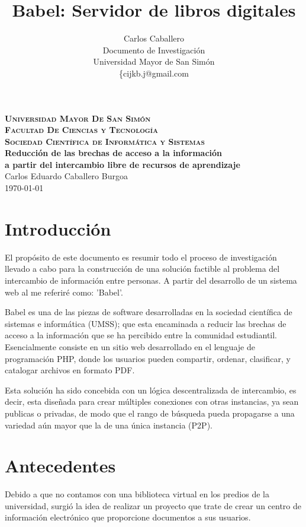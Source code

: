 \documentclass[letter,11pt,oneside,spanish]{article}
\title{\textbf{Babel: Servidor de libros digitales}}
\author{Carlos Caballero\\
Documento de Investigación\\
Universidad Mayor de San Simón\\
\{cijkb.j@gmail.com\\}
\date{}
\begin{document}
\begin{titlepage}
\thispagestyle{empty}
\begin{center}
\large{\textsc{\bf Universidad Mayor De San Simón}}\\
\large{\textsc{\bf Facultad De Ciencias y Tecnología}}\\
\large{\textsc{\bf Sociedad Científica de Informática y Sistemas}}\\
\vspace{4.0cm}
\large{\bf Reducción de las brechas de acceso a la información\\
a partir del intercambio libre de recursos de aprendizaje}\\
\vspace{1.0cm}
\small{Carlos Eduardo Caballero Burgoa}
~\\
\small{\today}
\end{center}
\end{titlepage}

\newpage
\tableofcontents

\newpage
\section{Introducción}
El propósito de este documento es resumir todo el proceso de investigación
llevado a cabo para la construcción de una solución factible al problema del
intercambio de información entre personas. A partir del desarrollo de un sistema
web al me referiré como: 'Babel'.

Babel es una de las piezas de software desarrolladas en la sociedad científica
de sistemas e informática (UMSS); que esta encaminada a reducir las brechas de
acceso a la información que se ha percibido entre la comunidad estudiantil.
Esencialmente consiste en un sitio web desarrollado en el lenguaje de
programación PHP, donde los usuarios pueden compartir, ordenar, clasificar, y
catalogar archivos en formato PDF.

Esta solución ha sido concebida con un lógica descentralizada de intercambio, es
decir, esta diseñada para crear múltiples conexiones con otras instancias, ya
sean publicas o privadas, de modo que el rango de búsqueda pueda propagarse a
una variedad aún mayor que la de una única instancia (P2P).

\section{Antecedentes}
Debido a que no contamos con una biblioteca virtual en los predios de la
universidad, surgió la idea de realizar un proyecto que trate de crear un centro
de información electrónico que proporcione documentos a sus usuarios.
\end{document}
